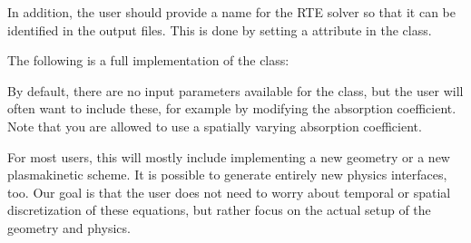 \documentclass[letterpaper,10pt,english]{sphinxmanual}
\begin{document}
\begin{sphinxVerbatim}[commandchars=\\\{\},formatcom=\scriptsize]
        
\end{sphinxVerbatim}

In addition, the user should provide a name for the RTE solver so that it can be identified in the output files. This is done by setting a  attribute in the {\hyperref[\detokenize{MinimalPlasmaModel:chap-photon}]{}} class.

The following is a full implementation of the {\hyperref[\detokenize{MinimalPlasmaModel:chap-photon}]{}} class:

\begin{sphinxVerbatim}[commandchars=\\\{\},formatcom=\scriptsize]
     
   
       


        
      
\end{sphinxVerbatim}

By default, there are no input parameters available for the {\hyperref[\detokenize{MinimalPlasmaModel:chap-photon}]{}} class, but the user will often want to include these, for example by modifying the absorption coefficient. Note that you are allowed to use a spatially varying absorption coefficient.

For most users, this will mostly include implementing a new geometry or a new plasma\sphinxhyphen{}kinetic scheme.
It is possible to generate entirely new physics interfaces, too.
Our goal is that the user does not need to worry about temporal or spatial discretization of these equations, but rather focus on the actual setup of the geometry and physics.
\end{document}
